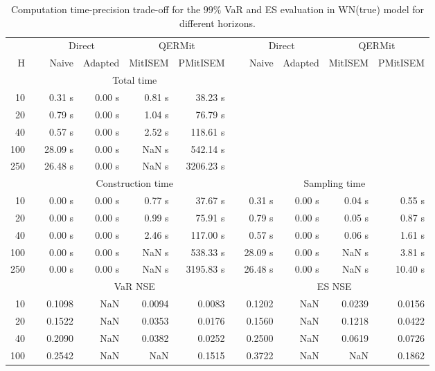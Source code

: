 { \renewcommand{\arraystretch}{1.3} 
\begin{table}[h] 
\centering 
\caption{Computation time-precision trade-off for the  $99\%$ VaR and ES evaluation in WN(true) model for different horizons.} 
\label{tab:time_precision_WN_ML} 
\begin{tabular}{rr rrrr r rrrr}  
 & & \multicolumn{2}{c}{Direct} & \multicolumn{2}{c}{QERMit}&  & \multicolumn{2}{c}{Direct} & \multicolumn{2}{c}{QERMit} \\ \cline{3-6} \cline{8-11} 
 H & & Naive & Adapted & MitISEM & PMitISEM & & Naive & Adapted & MitISEM & PMitISEM \\ \hline 
 & & \multicolumn{4}{c}{Total time}  \\ \cline{3-6} 
10 & & 0.31 s & 0.00 s & 0.81 s & 38.23 s \\ 
20 & & 0.79 s & 0.00 s & 1.04 s & 76.79 s \\ 
40 & & 0.57 s & 0.00 s & 2.52 s & 118.61 s \\ 
100 & & 28.09 s & 0.00 s &  NaN s & 542.14 s \\ 
250 & & 26.48 s & 0.00 s &  NaN s & 3206.23 s \\ 
\hline 
 & & \multicolumn{4}{c}{Construction time} & & \multicolumn{4}{c}{ Sampling time} \\ \cline{3-6}  \cline{8-11}
10 & & 0.00 s & 0.00 s & 0.77 s & 37.67 s && 0.31 s & 0.00 s & 0.04 s & 0.55 s \\ 
20 & & 0.00 s & 0.00 s & 0.99 s & 75.91 s && 0.79 s & 0.00 s & 0.05 s & 0.87 s \\ 
40 & & 0.00 s & 0.00 s & 2.46 s & 117.00 s && 0.57 s & 0.00 s & 0.06 s & 1.61 s \\ 
100 & & 0.00 s & 0.00 s &  NaN s & 538.33 s && 28.09 s & 0.00 s &  NaN s & 3.81 s \\ 
250 & & 0.00 s & 0.00 s &  NaN s & 3195.83 s && 26.48 s & 0.00 s &  NaN s & 10.40 s \\ 
\hline 
 & & \multicolumn{4}{c}{VaR NSE} &&  \multicolumn{4}{c}{ES NSE} \\ \cline{3-6}  \cline{8-11}
10 && 0.1098  &    NaN  & 0.0094 & 0.0083 && 0.1202  &    NaN  & 0.0239 & 0.0156 \\ 
20 && 0.1522  &    NaN  & 0.0353 & 0.0176 && 0.1560  &    NaN  & 0.1218 & 0.0422 \\ 
40 && 0.2090  &    NaN  & 0.0382 & 0.0252 && 0.2500  &    NaN  & 0.0619 & 0.0726 \\ 
100 && 0.2542  &    NaN  &    NaN & 0.1515 && 0.3722  &    NaN  &    NaN & 0.1862 \\ 

\end{tabular}
\end{table}}

